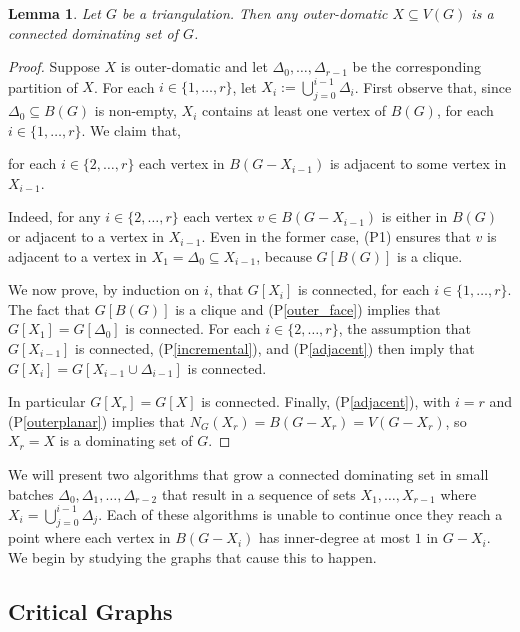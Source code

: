 \documentclass[11pt]{article}
\newcommand{\pref}[1]{(P\ref{#1})}
\newtheorem{lem}{Lemma}
\theoremstyle{definition}
\begin{document}
\begin{lem}\label{outer_domatic}
    Let $G$ be a triangulation.  Then any outer-domatic $X\subseteq V(G)$ is a connected dominating set of $G$.
\end{lem}

\begin{proof}
  Suppose $X$ is outer-domatic and let $\Delta_0,\ldots,\Delta_{r-1}$ be the corresponding partition of $X$.  For each $i\in\{1,\ldots,r\}$, let $X_i:=\bigcup_{j=0}^{i-1} \Delta_i$.  First observe that, since $\Delta_0\subseteq B(G)$ is non-empty, $X_i$ contains at least one vertex of $B(G)$, for each $i\in\{1,\ldots,r\}$. We claim that,
  \begin{compactenum}[(P1)]\setcounter{enumi}{3}
    \item for each $i\in\{2,\ldots,r\}$ each vertex in $B(G-X_{i-1})$ is adjacent to some vertex in $X_{i-1}$. \label{adjacent}
  \end{compactenum}
  Indeed, for any $i\in\{2,\ldots,r\}$ each vertex $v\in B(G-X_{i-1})$ is either in $B(G)$ or adjacent to a vertex in $X_{i-1}$. Even in the former case, (P1) ensures that $v$ is adjacent to a vertex in $X_1=\Delta_0\subseteq X_{i-1}$, because $G[B(G)]$ is a clique.

  We now prove, by induction on $i$, that $G[X_i]$ is connected, for each $i\in\{1,\ldots,r\}$.
  The fact that $G[B(G)]$ is a clique and \pref{outer_face} implies that $G[X_1]=G[\Delta_0]$ is connected. For each $i\in\{2,\ldots,r\}$, the assumption that $G[X_{i-1}]$ is connected, \pref{incremental}, and \pref{adjacent} then imply that $G[X_i]=G[X_{i-1}\cup\Delta_{i-1}]$ is connected.

  In particular $G[X_r]=G[X]$ is connected.  Finally, \pref{adjacent}, with $i=r$ and \pref{outerplanar} implies that $N_G(X_r)=B(G-X_r)=V(G-X_r)$, so $X_r=X$ is a dominating set of $G$.
\end{proof}

We will present two algorithms that grow a connected dominating set in small batches $\Delta_0,\Delta_1,\ldots,\Delta_{r-2}$ that result in a sequence of sets $X_1,\ldots,X_{r-1}$ where $X_{i}=\bigcup_{j=0}^{i-1}\Delta_j$.  Each of these algorithms is unable to continue once they reach a point where each vertex in $B(G-X_i)$ has inner-degree at most $1$ in $G-X_i$.  We begin by studying the graphs that cause this to happen.

\subsection{Critical Graphs}
\end{document}
